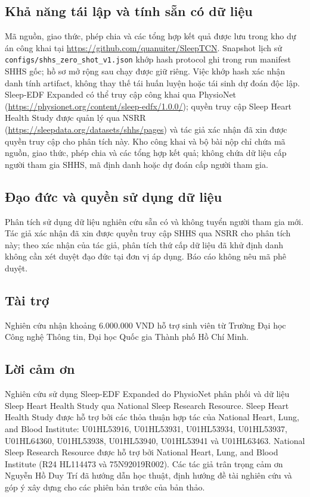 \documentclass[10pt,a4paper]{article}
\begin{document}
\subsection*{Khả năng tái lập và tính sẵn có dữ liệu}

Mã nguồn, giao thức, phép chia và các tổng hợp kết quả được lưu trong kho dự án công khai tại \url{https://github.com/quanuiter/SleepTCN}. Snapshot lịch sử \texttt{configs/shhs\_zero\_shot\_v1.json} khớp hash protocol ghi trong run manifest SHHS gốc; hồ sơ mở rộng sau chạy được giữ riêng. Việc khớp hash xác nhận danh tính artifact, không thay thế tái huấn luyện hoặc tái sinh dự đoán độc lập. Sleep-EDF Expanded có thể truy cập công khai qua PhysioNet (\url{https://physionet.org/content/sleep-edfx/1.0.0/}); quyền truy cập Sleep Heart Health Study được quản lý qua NSRR (\url{https://sleepdata.org/datasets/shhs/pages}) và tác giả xác nhận đã xin được quyền truy cập cho phân tích này. Kho công khai và bộ bài nộp chỉ chứa mã nguồn, giao thức, phép chia và các tổng hợp kết quả; không chứa dữ liệu cấp người tham gia SHHS, mã định danh hoặc dự đoán cấp người tham gia.

\subsection*{Đạo đức và quyền sử dụng dữ liệu}

Phân tích sử dụng dữ liệu nghiên cứu sẵn có và không tuyển người tham gia mới. Tác giả xác nhận đã xin được quyền truy cập SHHS qua NSRR cho phân tích này; theo xác nhận của tác giả, phân tích thứ cấp dữ liệu đã khử định danh không cần xét duyệt đạo đức tại đơn vị áp dụng. Báo cáo không nêu mã phê duyệt.

\subsection*{Tài trợ}

Nghiên cứu nhận khoảng 6.000.000 VND hỗ trợ sinh viên từ Trường Đại học Công nghệ Thông tin,
Đại học Quốc gia Thành phố Hồ Chí Minh.

\subsection*{Lời cảm ơn}

Nghiên cứu sử dụng Sleep-EDF Expanded do PhysioNet phân phối và dữ liệu Sleep Heart Health Study qua National Sleep Research Resource. Sleep Heart Health Study được hỗ trợ bởi các thỏa thuận hợp tác của National Heart, Lung, and Blood Institute: U01HL53916, U01HL53931, U01HL53934, U01HL53937, U01HL64360, U01HL53938, U01HL53940, U01HL53941 và U01HL63463. National Sleep Research Resource được hỗ trợ bởi National Heart, Lung, and Blood Institute (R24 HL114473 và 75N92019R002). Các tác giả trân trọng cảm ơn Nguyễn Hồ Duy Trí đã hướng dẫn học thuật, định hướng đề tài nghiên cứu và góp ý xây dựng cho các phiên bản trước của bản thảo.
\end{document}
